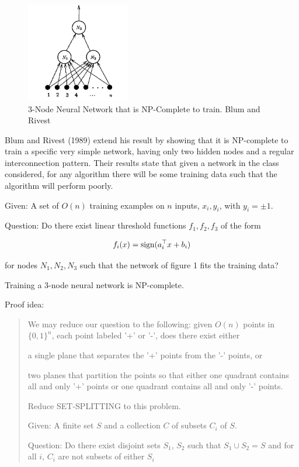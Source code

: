\documentclass[english]{article}
\begin{document}
\begin{figure}
  \centering
  \includegraphics[width=0.4\textwidth]{br.png}
  \caption{3-Node Neural Network that is
NP-Complete to train. Blum and Rivest}
\end{figure}


Blum and Rivest (1989) extend his result by showing that it is NP-complete to train a specific very
simple network, having only two hidden nodes and a regular interconnection
pattern. Their results state that given a network in the class considered, for any
algorithm there will be some training data such that the algorithm
will perform poorly.

Given: A set of $O(n)$ training examples on $n$ inputs, $x_i,y_i$, with $y_i  = \pm 1$.

Question: Do there exist linear threshold functions $f_1,f_2,f_3$ of the form

$$f_i(x) = \operatorname{sign}(a_i^\top x + b_i)$$

for nodes $N_1, N_2, N_3$ such that the network of figure 1 fits the training data?


\begin{theorem} Training a 3-node neural network is NP-complete.
\end{theorem}
Proof idea: 

\begin{quote}
We may reduce our question to the following: given $O(n)$ points in $\{0, 1\}^n$,
each point labeled '+' or '-', does there exist either
\benum

\item a single plane that separates the '+' points from the '-' points, or

\item two planes that partition the points so that either one quadrant contains all and only '+' points or one quadrant contains all and only '-' points.


\eenum

Reduce SET-SPLITTING to this problem.

Given: A finite set $S$ and a collection $C$ of subsets $C_i$ of $S$.

Question: Do there exist disjoint sets $S_1$, $S_2$ such that $S_1 \cup S_2 = S$ and for all $i$, $C_i$ are not subsets of either $S_i$

\end{quote}
\end{document}
